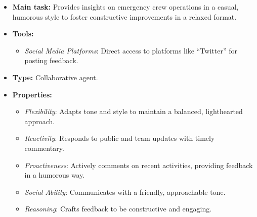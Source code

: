 \begin{itemize}
    \item \textbf{Main task:} Provides insights on emergency crew operations in a casual, humorous style to foster constructive improvements in a relaxed format.
    \item \textbf{Tools:} 
    \begin{itemize}
        \item \emph{Social Media Platforms}: Direct access to platforms like ``Twitter'' for posting feedback.
    \end{itemize}
    \item \textbf{Type:} Collaborative agent.
    \item \textbf{Properties:}
    \begin{itemize}
        \item \emph{Flexibility}: Adapts tone and style to maintain a balanced, lighthearted approach.
        \item \emph{Reactivity}: Responds to public and team updates with timely commentary.
        \item \emph{Proactiveness}: Actively comments on recent activities, providing feedback in a humorous way.
        \item \emph{Social Ability}: Communicates with a friendly, approachable tone.
        \item \emph{Reasoning}: Crafts feedback to be constructive and engaging.
    \end{itemize}
\end{itemize}
